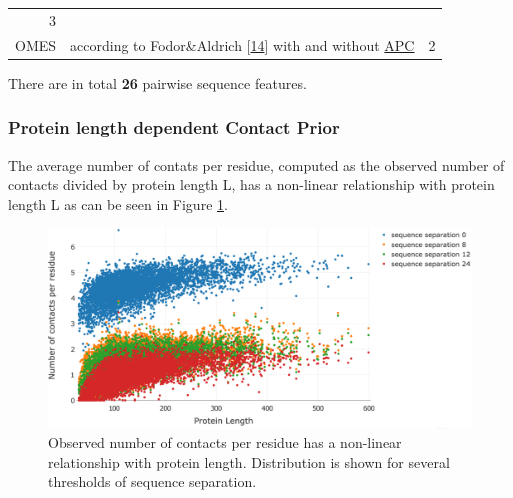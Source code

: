 \documentclass[12pt,a4paper,twoside]{book}
\theoremstyle{definition}
\theoremstyle{definition}
\theoremstyle{remark}
\begin{document}
\begin{longtable}[]{@{}rlc@{}}
\begin{minipage}[t]{0.18\columnwidth}
3\strut
\end{minipage}\tabularnewline
\begin{minipage}[t]{0.23\columnwidth}\raggedleft\strut
OMES\strut
\end{minipage} & \begin{minipage}[t]{0.50\columnwidth}\raggedright\strut
according to Fodor\&Aldrich {[}\protect\hyperlink{ref-Fodor2004a}{14}{]}
with and without \protect\hyperlink{abbrev}{APC}\strut
\end{minipage} & \begin{minipage}[t]{0.18\columnwidth}\centering\strut
2\strut
\end{minipage}\tabularnewline
\bottomrule
\end{longtable}

There are in total \textbf{26} pairwise sequence features.

\subsubsection{Protein length dependent Contact
Prior}\label{contact-prior-protein-length}

The average number of contats per residue, computed as the observed
number of contacts divided by protein length L, has a non-linear
relationship with protein length L as can be seen in Figure
\ref{fig:avg-nr-contacts-per-residue-vs-protein-length}.






\begin{figure}

{\centering \includegraphics[width=0.8\linewidth]{img/random_forest_contact_prior/no_contacts_per_residue_vs_protein_length_thr8} 

}

\caption{Observed
number of contacts per residue has a non-linear relationship with
protein length. Distribution is shown for several thresholds of sequence
separation.}\label{fig:avg-nr-contacts-per-residue-vs-protein-length}
\end{figure}
\end{document}

